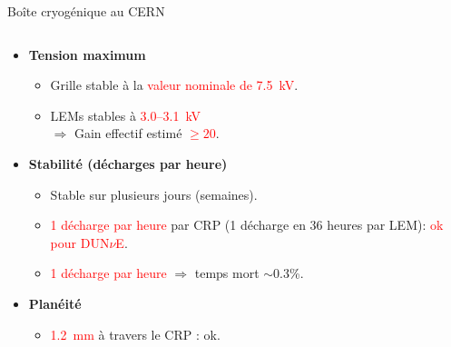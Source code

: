 \begin{frame}{Boîte cryogénique au CERN}
\begin{columns}
\begin{column}{0.6\textwidth}
\begin{scriptsize}
	    			\begin{itemize}
	    				\item \textbf{Tension maximum}
	    				\begin{itemize}
	    					\item Grille stable à la \textcolor{red}{valeur nominale de \SI{7.5}{\kilo\volt}}.
	    					\item LEMs stables à \textcolor{red}{3.0--\SI{3.1}{\kilo\volt}}\\
				    					$\Rightarrow$ Gain effectif estimé \textcolor{red}{$\geq 20$}.
	    				\end{itemize}
	    				\item \textbf{Stabilité (décharges par heure)}
	    				\begin{itemize}
	    					\item Stable sur plusieurs jours (semaines).
	    					\item \textcolor{red}{1 décharge par heure} par CRP (1 décharge en 36 heures par LEM): \textcolor{red}{ok pour DUN$\nu$E}.
	    					\item \textcolor{red}{1 décharge par heure} $\Rightarrow$ temps mort $\sim$0.3\%.
	    				\end{itemize}
	    				\item \textbf{Planéité}
	    				\begin{itemize}
	    					\item \textcolor{red}{\SI{1.2}{\milli\meter}} à travers le CRP : ok.
	    				\end{itemize}
	    			\end{itemize}
	    		\end{scriptsize}
    		\end{column}
    	\end{columns}
	    \end{frame}


